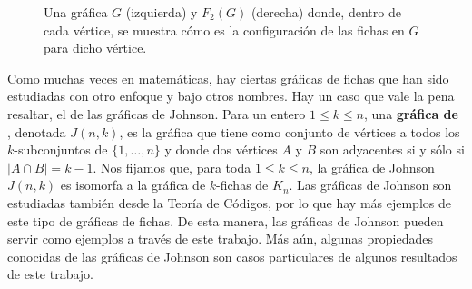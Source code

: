 \begin{figure}[ht!]
    \caption{Una gr\'afica $G$ (izquierda) y $F_2(G)$ (derecha) donde, dentro de
    cada v\'ertice, se muestra c\'omo es la configuraci\'on de las fichas en $G$
    para dicho v\'ertice.}
    \label{fig:ex-tok-graph}
\end{figure}

Como muchas veces en matem\'aticas, hay ciertas gr\'aficas de fichas que han
sido estudiadas con otro enfoque y bajo otros nombres. Hay un caso que vale la
pena resaltar, el de las gr\'aficas de Johnson. Para un entero $1 \leq k \leq
n$, una \textbf{gr\'afica de} , denotada $J(n,k)$,
es la gr\'afica que tiene como conjunto de v\'ertices a todos los
$k$-subconjuntos de $\{1, \dots, n\}$ y donde dos v\'ertices $A$ y $B$ son
adyacentes si y s\'olo si $|A \cap B| = k-1$. Nos fijamos que, para toda $1 \leq
k \leq n$, la gr\'afica de Johnson $J(n,k)$ es isomorfa a la gr\'afica de
$k$-fichas de $K_n$. Las gr\'aficas de Johnson son estudiadas tambi\'en desde la
Teor\'ia de C\'odigos, por lo que hay m\'as ejemplos de este tipo de gr\'aficas
de fichas. De esta manera, las gr\'aficas de Johnson pueden servir como ejemplos
a trav\'es de este trabajo. M\'as a\'un, algunas propiedades conocidas de las
gr\'aficas de Johnson son casos particulares de algunos resultados de este
trabajo.

